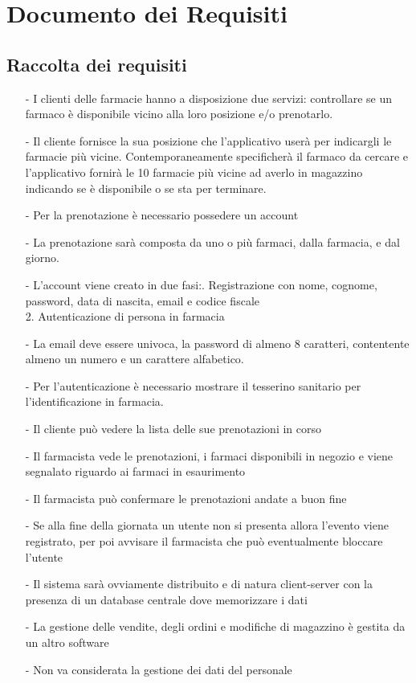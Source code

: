 \newpage
\section{Documento dei Requisiti}

\subsection{Raccolta dei requisiti}

\begin{itemize}
  \item[-] I clienti delle farmacie hanno a disposizione due servizi: controllare se un farmaco è disponibile vicino alla loro posizione e/o prenotarlo.
  \item[-] Il cliente fornisce la sua posizione che l'applicativo userà per indicargli le farmacie più vicine. Contemporaneamente specificherà il farmaco da cercare e l'applicativo fornirà le 10 farmacie più vicine ad averlo in magazzino indicando se è disponibile o se sta per terminare.
  \item[-] Per la prenotazione è necessario possedere un account
  \item[-] La prenotazione sarà composta da uno o più farmaci, dalla farmacia, e dal giorno. 
  \item[-] L'account viene creato in due fasi:. Registrazione con nome, cognome, password, data di nascita, email e codice fiscale\\
      2. Autenticazione di persona in farmacia
  \item[-] La email deve essere univoca, la password di almeno 8 caratteri, contentente almeno un numero e un carattere alfabetico.
  \item[-] Per l'autenticazione è necessario mostrare il tesserino sanitario per l'identificazione in farmacia.
  \item[-] Il cliente può vedere la lista delle sue prenotazioni in corso
  \item[-] Il farmacista vede le prenotazioni, i farmaci disponibili in negozio e viene segnalato riguardo ai farmaci in esaurimento
  \item[-] Il farmacista può confermare le prenotazioni andate a buon fine
  \item[-] Se alla fine della giornata un utente non si presenta allora l'evento viene registrato, per poi avvisare il farmacista che può eventualmente bloccare l'utente
  \item[-] Il sistema sarà ovviamente distribuito e di natura client-server con la presenza di un database centrale dove memorizzare i dati
  \item[-] La gestione delle vendite, degli ordini e modifiche di magazzino è gestita da un altro software
  \item[-] Non va considerata la gestione dei dati del personale 
\end{itemize}


